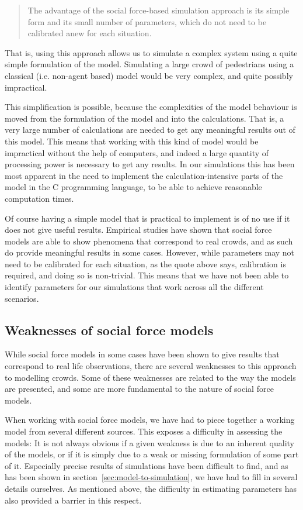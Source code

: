 \begin{quote}
    The advantage of the social force-based simulation approach is its simple 
    form and its small number of parameters, which do not need to be 
    calibrated anew for each situation.
\end{quote}

That is, using this approach allows us to simulate a complex system using a 
quite simple formulation of the model. Simulating a large crowd of pedestrians 
using a classical (i.e. non-agent based) model would be very complex, and 
quite possibly impractical.

This simplification is possible, because the complexities of the model 
behaviour is moved from the formulation of the model and into the 
calculations. That is, a very large number of calculations are needed to get 
any meaningful results out of this model. This means that working with this 
kind of model would be impractical without the help of computers, and indeed a 
large quantity of processing power is necessary to get any results. In our 
simulations this has been most apparent in the need to implement the 
calculation-intensive parts of the model in the C programming language, to be 
able to achieve reasonable computation times.

Of course having a simple model that is practical to implement is of no use if 
it does not give useful results. Empirical studies have shown that social 
force models are able to show phenomena that correspond to real crowds, and as 
such do provide meaningful results in some cases. However, while parameters 
may not need to be calibrated for each situation, as the quote above says, 
calibration is required, and doing so is non-trivial. This means that we have 
not been able to identify parameters for our simulations that work across all 
the different scenarios.

\subsection{Weaknesses of social force models}
While social force models in some cases have been shown to give results that 
correspond to real life observations, there are several weaknesses to this 
approach to modelling crowds. Some of these weaknesses are related to the way 
the models are presented, and some are more fundamental to the nature of 
social force models.

When working with social force models, we have had to piece together a working 
model from several different sources. This exposes a difficulty in assessing 
the models: It is not always obvious if a given weakness is due to an inherent 
quality of the models, or if it is simply due to a weak or missing formulation 
of some part of it. Especially precise results of simulations have been 
difficult to find, and as has been shown in 
section~\ref{sec:model-to-simulation}, we have had to fill in several details 
ourselves. As mentioned above, the difficulty in estimating parameters has 
also provided a barrier in this respect.

